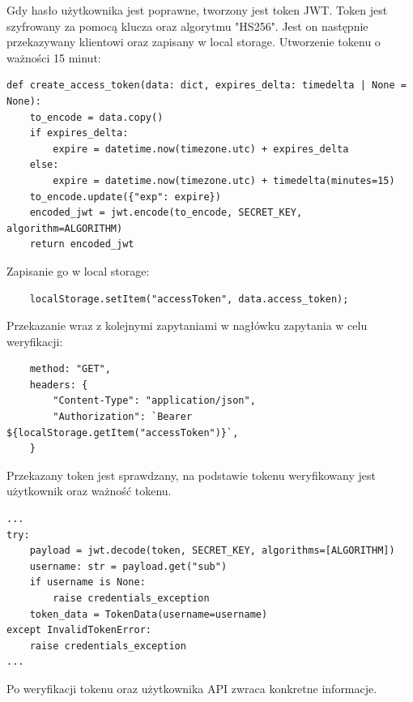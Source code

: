 Gdy hasło użytkownika jest poprawne, tworzony jest token JWT. Token jest szyfrowany za pomocą klucza oraz algorytmu "HS256". Jest on następnie przekazywany klientowi oraz zapisany w local storage. Utworzenie tokenu o ważności 15 minut:
\begin{verbatim}
def create_access_token(data: dict, expires_delta: timedelta | None = None):
    to_encode = data.copy()
    if expires_delta:
        expire = datetime.now(timezone.utc) + expires_delta
    else:
        expire = datetime.now(timezone.utc) + timedelta(minutes=15)
    to_encode.update({"exp": expire})
    encoded_jwt = jwt.encode(to_encode, SECRET_KEY, algorithm=ALGORITHM)
    return encoded_jwt
\end{verbatim}
Zapisanie go w local storage:
\begin{verbatim}
    localStorage.setItem("accessToken", data.access_token);
\end{verbatim}
Przekazanie wraz z kolejnymi zapytaniami w nagłówku zapytania w celu weryfikacji:
\begin{verbatim}
    method: "GET",
    headers: {
        "Content-Type": "application/json",
        "Authorization": `Bearer ${localStorage.getItem("accessToken")}`,
    }
\end{verbatim}
Przekazany token jest sprawdzany, na podstawie tokenu weryfikowany jest użytkownik oraz ważność tokenu.
\begin{verbatim}
...
try:
    payload = jwt.decode(token, SECRET_KEY, algorithms=[ALGORITHM])
    username: str = payload.get("sub")
    if username is None:
        raise credentials_exception
    token_data = TokenData(username=username)
except InvalidTokenError:
    raise credentials_exception
...
\end{verbatim}
Po weryfikacji tokenu oraz użytkownika API zwraca konkretne informacje.